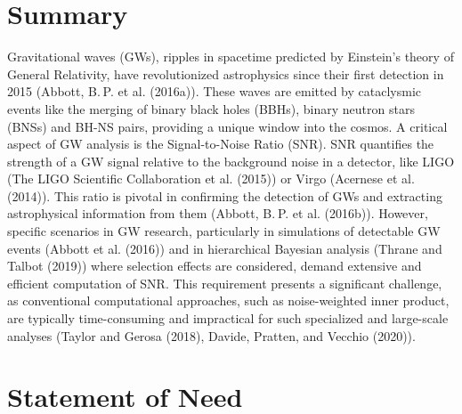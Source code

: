 \documentclass[10pt,a4paper,onecolumn]{article}
\begin{document}
\section{Summary}\label{summary}

Gravitational waves (GWs), ripples in spacetime predicted by Einstein's
theory of General Relativity, have revolutionized astrophysics since
their first detection in 2015 (Abbott, B. P. et al. (2016a)). These
waves are emitted by cataclysmic events like the merging of binary black
holes (BBHs), binary neutron stars (BNSs) and BH-NS pairs, providing a
unique window into the cosmos. A critical aspect of GW analysis is the
Signal-to-Noise Ratio (SNR). SNR quantifies the strength of a GW signal
relative to the background noise in a detector, like LIGO (The LIGO
Scientific Collaboration et al. (2015)) or Virgo (Acernese et al.
(2014)). This ratio is pivotal in confirming the detection of GWs and
extracting astrophysical information from them (Abbott, B. P. et al.
(2016b)). However, specific scenarios in GW research, particularly in
simulations of detectable GW events (Abbott et al. (2016)) and in
hierarchical Bayesian analysis (Thrane and Talbot (2019)) where
selection effects are considered, demand extensive and efficient
computation of SNR. This requirement presents a significant challenge,
as conventional computational approaches, such as noise-weighted inner
product, are typically time-consuming and impractical for such
specialized and large-scale analyses (Taylor and Gerosa (2018), Davide,
Pratten, and Vecchio (2020)).

\section{Statement of Need}\label{statement-of-need}
\end{document}
